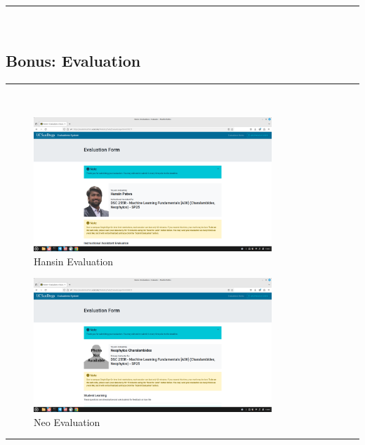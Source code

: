 \documentclass{article}
\begin{document}
\noindent\rule{\textwidth}{0.4pt}\\

\newpage
\subsection*{Bonus: Evaluation}
\noindent\rule{\textwidth}{0.4pt}\\

\begin{figure}[htbp] %
  \centering
  \includegraphics[width=0.8\textwidth, height=0.4\textheight, keepaspectratio]{te_1.png}
  \caption{Hansin Evaluation}
  \label{fig:te1}
\end{figure}

\begin{figure}[htbp] %
  \centering
  \includegraphics[width=0.8\textwidth, height=0.4\textheight, keepaspectratio]{te_2.png}
  \caption{Neo Evaluation}
  \label{fig:te2}
\end{figure}

\noindent\rule{\textwidth}{0.4pt}\\
\end{document}
